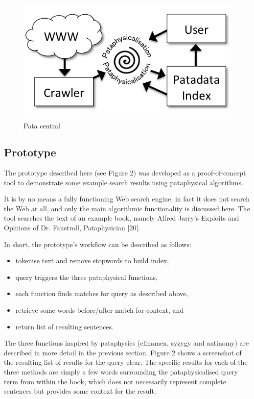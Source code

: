 \begin{figure}[!htb] %
\centering
\includegraphics[height=0.3\textheight]{images/diagram.png}
\caption[Pata central]{Pata central}
\label{fig:pata2}
\end{figure}

\subsection{Prototype}

The prototype described here (see Figure 2) was developed as a proof-of-concept tool to demonstrate some example search results using pataphysical algorithms.

It is by no means a fully functioning Web search engine, in fact it does not search the Web at all, and only the main algorithmic functionality is discussed here. The tool searches the text of an example book, namely Alfred Jarry’s Exploits and Opinions of Dr. Faustroll, Pataphysician [20].

In short, the prototype’s workflow can be described as follows:
\begin{itemize}
\item tokenise text and remove stopwords to build index,
\item query triggers the three pataphysical functions,
\item each function finds matches for query as described above,
\item retrieve some words before/after match for context, and
\item return list of resulting sentences.
\end{itemize}

The three functions inspired by pataphysics (clinamen, syzygy and antinomy) are described in more detail in the previous section. Figure 2 shows a screenshot of the resulting list of results for the query clear. The specific results for each of the three methods are simply a few words surrounding the pataphysicalised query term from within the book, which does not necessarily represent complete sentences but provides some context for the result.

